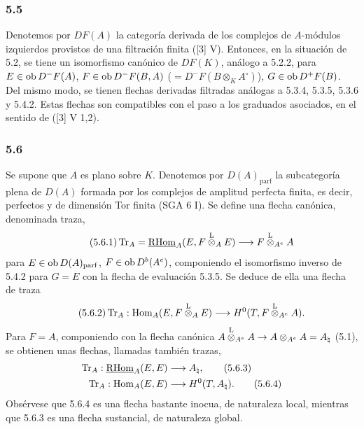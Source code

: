 \subsubsection*{5.5}

Denotemos por $DF(A)$ la categoría derivada de los complejos de $A$-módulos izquierdos provistos de una filtración finita ([3] V). Entonces, en la situación de 5.2, se tiene un isomorfismo canónico de $DF(K)$, análogo a 5.2.2, para $E\in\operatorname{ob} D^-F(A)$, $F\in\operatorname{ob} D^-F(B,A)$ ($=D^-F(B\otimes_KA^\circ)$), $G\in\operatorname{ob} D^+F(B)$. Del mismo modo, se tienen flechas derivadas filtradas análogas a 5.3.4, 5.3.5, 5.3.6 y 5.4.2. Estas flechas son compatibles con el paso a los graduados asociados, en el sentido de ([3] V 1,2).

\subsubsection*{5.6}

Se supone que $A$ es plano sobre $K$. Denotemos por $D(A)_{\mathrm{parf}}$ la subcategoría plena de $D(A)$ formada por los complejos de amplitud perfecta finita, es decir, perfectos y de dimensión Tor finita (SGA 6 I). Se define una flecha canónica, denominada traza,
\begin{equation}\tag{5.6.1}
\operatorname{Tr}_A=\underline{\mathrm{RHom}}_A(E,F\overset{\mathrm L}{\otimes}_AE)\longrightarrow F\overset{\mathrm L}{\otimes}_{A^e}A
\end{equation}
para $E\in\operatorname{ob} D(A)_{\mathrm{parf}}$, $F\in\operatorname{ob} D^b(A^e)$, componiendo el isomorfismo inverso de 5.4.2 para $G=E$ con la flecha de evaluación 5.3.5. Se deduce de ella una flecha de traza
\begin{equation}\tag{5.6.2}
\operatorname{Tr}_A:\operatorname{Hom}_A(E,F\overset{\mathrm L}{\otimes}_AE)\longrightarrow H^0(T,F\overset{\mathrm L}{\otimes}_{A^e}A).
\end{equation}
Para $F=A$, componiendo con la flecha canónica $A\overset{\mathrm L}{\otimes}_{A^e}A\to A\otimes_{A^e}A=A_\natural$ (5.1), se obtienen unas flechas, llamadas también trazas,
\begin{align}
\operatorname{Tr}_A:\underline{\mathrm{RHom}}_A(E,E)&\longrightarrow A_\natural,\tag{5.6.3}\\
\operatorname{Tr}_A:\operatorname{Hom}_A(E,E)&\longrightarrow H^0(T,A_\natural).\tag{5.6.4}
\end{align}
Obsérvese que 5.6.4 es una flecha bastante inocua, de naturaleza local, mientras que 5.6.3 es una flecha sustancial, de naturaleza global.

